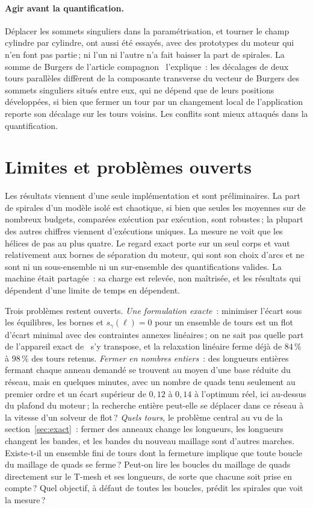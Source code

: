 \documentclass[11pt,a4paper]{article}
\newcommand{\shift}{s}
\begin{document}
\paragraph{Agir avant la quantification.}
Déplacer les sommets singuliers dans la paramétrisation, et tourner le champ
cylindre par cylindre, ont aussi été essayés, avec des prototypes du moteur
qui n'en font pas partie\,; ni l'un ni l'autre n'a fait baisser la part de
spirales. La somme de Burgers de l'article compagnon~\cite{gardent2026turns}
l'explique~: les décalages de deux tours parallèles diffèrent de la
composante transverse du vecteur de Burgers des sommets singuliers situés
entre eux, qui ne dépend que de leurs positions développées, si bien que
fermer un tour par un changement local de l'application reporte son décalage
sur les tours voisins. Les conflits sont mieux attaqués dans la
quantification.

\section{Limites et problèmes ouverts}\label{sec:limits}

Les résultats viennent d'une seule implémentation et sont préliminaires. La
part de spirales d'un modèle isolé est chaotique, si bien que seules les
moyennes sur de nombreux budgets, comparées exécution par exécution, sont
robustes\,; la plupart des autres chiffres viennent d'exécutions uniques. La mesure ne voit que les hélices de pas au plus
quatre. Le regard exact porte sur un seul corps et vaut relativement aux
bornes de séparation du moteur, qui sont son choix d'arcs et ne sont ni un
sous-ensemble ni un sur-ensemble des quantifications valides. La machine
était partagée~: sa charge est relevée, non maîtrisée, et les résultats qui
dépendent d'une limite de temps en dépendent.

Trois problèmes restent ouverts. \emph{Une formulation exacte}~: minimiser
l'écart sous les équilibres, les bornes et $\shift_\gamma(\ell) = 0$ pour un
ensemble de tours est un flot d'écart minimal avec des contraintes annexes
linéaires\,; on ne sait pas quelle part de l'appareil exact
de~\cite{heistermann2023bimdf} s'y transpose, et la relaxation linéaire
ferme déjà de $84\,\%$ à $98\,\%$ des tours retenus. \emph{Fermer en nombres
entiers}~: des longueurs entières fermant chaque anneau demandé se trouvent
au moyen d'une base réduite du réseau, mais en quelques minutes, avec un
nombre de quads tenu seulement au premier ordre et un écart supérieur de
$0,12$ à $0,14$ à l'optimum réel, ici au-dessus du plafond du moteur\,; la
recherche entière peut-elle se
déplacer dans ce réseau à la vitesse d'un solveur de flot\,? \emph{Quels
tours}, le problème central au vu de la section~\ref{sec:exact}~: fermer
des anneaux change les longueurs, les longueurs changent les bandes, et les
bandes du nouveau maillage sont d'autres marches. Existe-t-il un ensemble
fini de tours dont la fermeture implique que toute boucle du maillage de
quads se ferme\,? Peut-on lire les boucles du maillage de quads directement
sur le T-mesh et ses longueurs, de sorte que chacune soit prise en
compte\,? Quel objectif, à défaut de toutes les boucles, prédit les spirales
que voit la mesure\,?
\end{document}
